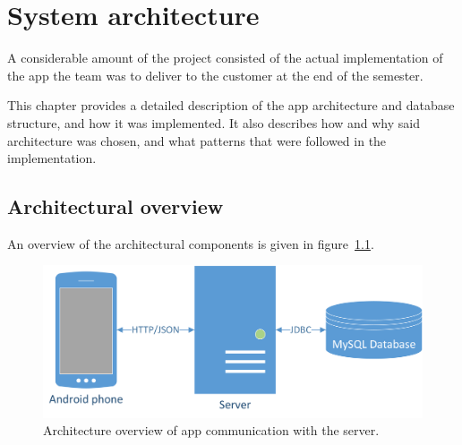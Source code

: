 \chapter{System architecture}

A considerable amount of the project consisted of the actual implementation of the app the team was to deliver to the customer at the end of the semester. 

This chapter provides a detailed description of the app architecture and database structure, and how it was implemented. It also describes how and why said architecture was chosen, and what patterns that were followed in the implementation. 

\section{Architectural overview}
An overview of the architectural components is given in figure~\ref{fig:architecture}.

\begin{figure}[H]
\includegraphics[width=\textwidth]{ch/architecture/fig/arch.png}
\caption{Architecture overview of app communication with the server.}
\label{fig:architecture}
\end{figure}





